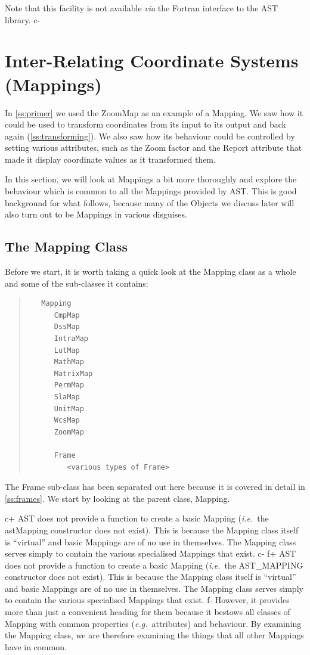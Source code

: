 \documentclass[twoside,11pt]{article}
\newcommand{\secref}[1]{\S\ref{#1}}
\renewcommand{\secref}[1]{\ref{#1}}
\begin{document}
Note that this facility is not available {\em{via}} the Fortran
interface to the AST library.
c-

\cleardoublepage
\section{\label{ss:mappings}Inter-Relating Coordinate Systems (Mappings)}

In \secref{ss:primer} we used the ZoomMap as an example of a
Mapping. We saw how it could be used to transform coordinates from its
input to its output and back again (\secref{ss:transforming}). We also
saw how its behaviour could be controlled by setting various
attributes, such as the Zoom factor and the Report attribute that made
it display coordinate values as it transformed them.

In this section, we will look at Mappings a bit more thoroughly and
explore the behaviour which is common to all the Mappings provided by
AST.  This is good background for what follows, because many of the
Objects we discuss later will also turn out to be Mappings in various
disguises.

\subsection{\label{ss:mappingclass}The Mapping Class}

Before we start, it is worth taking a quick look at the Mapping class
as a whole and some of the sub-classes it contains:

\begin{quote}
\begin{verbatim}
   Mapping
      CmpMap
      DssMap
      IntraMap
      LutMap
      MathMap
      MatrixMap
      PermMap
      SlaMap
      UnitMap
      WcsMap
      ZoomMap

      Frame
         <various types of Frame>
\end{verbatim}
\end{quote}

The Frame sub-class has been separated out here because it is covered
in detail in \secref{ss:frames}. We start by looking at the parent
class, Mapping.

c+
AST does not provide a function to create a basic Mapping
({\em{i.e.}}\ the astMapping constructor does not exist). This is
because the Mapping class itself is ``virtual'' and basic Mappings are
of no use in themselves. The Mapping class serves simply to contain
the various specialised Mappings that exist.
c-
f+
AST does not provide a function to create a basic Mapping
({\em{i.e.}}\ the AST\_MAPPING constructor does not exist). This is
because the Mapping class itself is ``virtual'' and basic Mappings are
of no use in themselves. The Mapping class serves simply to contain
the various specialised Mappings that exist.
f-
However, it provides more than just a convenient heading for them
because it bestows all classes of Mapping with common properties
({\em{e.g.}}\ attributes) and behaviour.  By examining the Mapping
class, we are therefore examining the things that all other Mappings
have in common.
\end{document}
